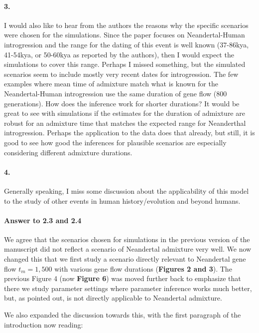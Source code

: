 \documentclass[11pt]{article}
\let\oldparagraph\paragraph
\renewcommand{\paragraph}[1]{\oldparagraph{#1}\mbox{}}
\begin{document}
\paragraph{3.}
I would also like to hear from the authors the reasons why the specific scenarios were chosen for the simulations. Since the paper focuses on Neandertal-Human introgression and the range for the dating of this event is well known (37-86kya, 41-54kya, or 50-60kya as reported by the authors), then I would expect the simulations to cover this range. Perhaps I missed something, but the simulated scenarios seem to include mostly very recent dates for introgression. The few examples where mean time of admixture match what is known for the Neandertal-Human introgression use the same duration of gene flow (800 generations). How does the inference work for shorter durations? It would be great to see with simulations if the estimates for the duration of admixture are robust for an admixture time that matches the expected range for Neanderthal introgression. Perhaps the application to the data does that already, but still, it is good to see how good the inferences for plausible scenarios are especially considering different admixture durations.

\paragraph{4.}
Generally speaking, I miss some discussion about the applicability of this model to the study of other events in human history/evolution and beyond humans.


\paragraph{Answer to 2.3 and 2.4}
We agree that the scenarios chosen for simulations in the previous version of the manuscript did not reflect a scenario of Neandertal admixture very well. We now changed this that we first study a scenario directly relevant to Neandertal gene flow $t_m=1,500$  with various gene flow durations (\textbf{Figures 2 and 3}). The previous Figure 4 (now \textbf{Figure 6}) was moved further back to emphasize that there we study parameter settings where parameter inference works much better, but, as pointed out, is not directly applicable to Neandertal admixture.

We also expanded  the discussion towards this, with the  first paragraph of the introduction now reading:
\end{document}
